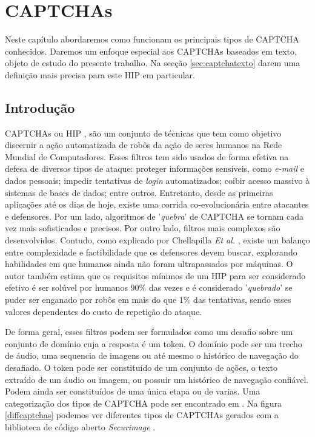 \chapter{CAPTCHAs}\label{cap:captchas}

Neste capítulo abordaremos como funcionam os principais tipos de CAPTCHA conhecidos. Daremos um enfoque especial aos CAPTCHAs baseados em texto, objeto de estudo do presente trabalho. Na secção \ref{sec:captchatexto} darem uma definição mais precisa para este HIP em particular.

\section{Introdução}

CAPTCHAs \cite{captcha2003} ou HIP \cite{lectures2005HIP}, são um conjunto de técnicas que tem como objetivo discernir a ação automatizada de robôs da ação de seres humanos na Rede Mundial de Computadores. Esses filtros tem sido usados de forma efetiva na defesa de diversos tipos de ataque: proteger informações sensíveis, como \textit{e-mail} e dados pessoais; impedir tentativas de \textit{login} automatizados; coibir acesso massivo à sistemas de bases de dados; entre outros. Entretanto, desde as primeiras aplicações até os dias de hoje, existe uma corrida co-evolucionária entre atacantes e defensores. Por um lado, algoritmos de '\textit{quebra}' de CAPTCHA se  tornam cada vez mais sofisticados e precisos. Por outro lado, filtros mais complexos são desenvolvidos. Contudo, como explicado por Chellapilla \textit{Et al.} \cite{lectures2005HIP}, existe um balanço entre complexidade e factibilidade que os defensores devem buscar, explorando habilidades em que humanos ainda não foram ultrapassados por máquinas. O autor também estima que os requisitos mínimos de um HIP para ser considerado efetivo é ser solúvel por humanos $90\%$ das vezes e é considerado '\textit{quebrado}' se puder ser enganado por robôs em mais do que $1\%$ das tentativas, sendo esses valores dependentes do custo de repetição do ataque.

De forma geral, esses filtros podem ser formulados como um desafio sobre um conjunto de domínio cuja a resposta é um token. O domínio pode ser um trecho de áudio, uma sequencia de imagens ou até mesmo o histórico de navegação do desafiado. O token pode ser constituído de um conjunto de ações, o texto extraído de um áudio ou imagem, ou possuir um histórico de navegação confiável. Podem ainda ser constituídos de uma única etapa ou de varias. Uma categorização dos tipos de CAPTCHA pode ser encontrado em \cite{singh2014survey}. Na figura \ref{diffcaptchas} podemos ver diferentes tipos de CAPTCHAs gerados com a biblioteca de código aberto \textit{Securimage} \cite{securimage}.

